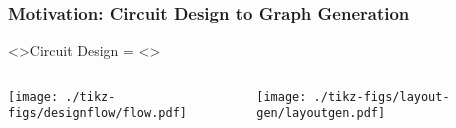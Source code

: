 \documentclass[./presentation.tex]{subfiles}
\begin{document}
\begin{frame}[label=workingonly,t]
  \frametitle{Motivation: Circuit Design to Graph Generation}
  \centering
  \resetmfrc{}
  \only<\mfrc{}>{Circuit Design =}
\stepmfrc{}
\only<\mfrc{}>{
\begin{columns}
  \begin{column}{0.5\textwidth}
    \texttt{[image: ./tikz-figs/designflow/flow.pdf]}
  \end{column}
  \begin{column}{0.5\textwidth}
    \texttt{[image: ./tikz-figs/layout-gen/layoutgen.pdf]}
  \end{column}
\end{columns}
}
%

\end{frame}
\end{document}
